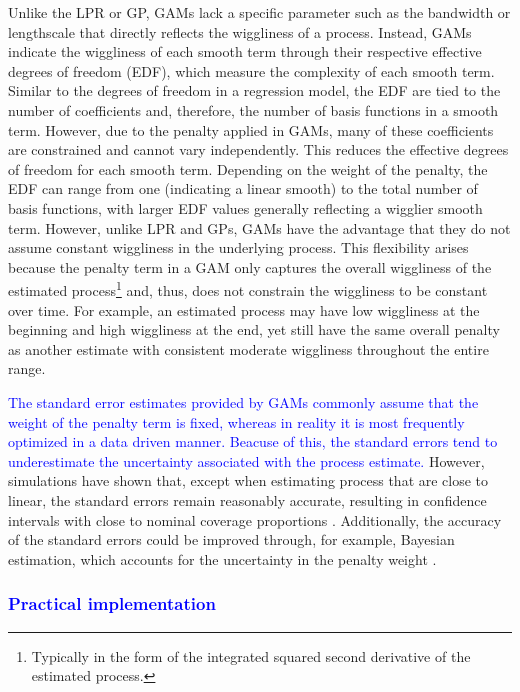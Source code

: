 \documentclass[man, floatsintext]{apa7}
\begin{document}
Unlike the LPR or GP, GAMs lack a specific parameter such as the bandwidth or
lengthscale that directly reflects the wiggliness of a process.
Instead, GAMs indicate the wiggliness of each smooth term through their
respective effective degrees of freedom (EDF), which measure the complexity of
each smooth term. Similar to the degrees of freedom in a regression model, the
EDF are tied to the number of coefficients and, therefore, the number of basis
functions in a smooth term. However, due to the penalty applied in GAMs, many
of these coefficients are constrained and cannot vary independently. This
reduces the effective degrees of freedom for each smooth term. Depending on the
weight of the penalty, the EDF can range from one (indicating a linear smooth)
to the total number of basis functions, with larger EDF values generally
reflecting a wigglier smooth term. However, unlike LPR and GPs, GAMs have the
advantage that they do not assume constant wiggliness in the underlying
process. This flexibility arises because the penalty term in a GAM only
captures the overall wiggliness of the estimated process\footnote{Typically in
  the form of the integrated squared second derivative of the estimated
  process.}
and, thus, does not constrain the wiggliness to be constant over time. For
example, an estimated process may have low wiggliness at the beginning and high
wiggliness at the end, yet still have the same overall penalty as another
estimate with consistent moderate wiggliness throughout the entire range.

\textcolor{blue}{
  The standard error estimates provided by GAMs commonly assume that the weight
  of the penalty term is fixed, whereas in reality it is most frequently
  optimized in a data driven manner. Beacuse of this, the standard errors
  tend to underestimate the uncertainty associated with the process estimate.}
However, simulations have shown that,
except when estimating process that are close to linear, the standard errors
remain reasonably accurate, resulting in confidence intervals with close to
nominal coverage proportions \parencite{marra_coverage_2012}. Additionally, the
accuracy of the standard errors could be improved through, for example,
Bayesian estimation, which accounts for the uncertainty in the penalty weight
\parencite{wood_generalized_2006}.

\subsubsection{\textcolor{blue}{Practical implementation}}
\end{document}
